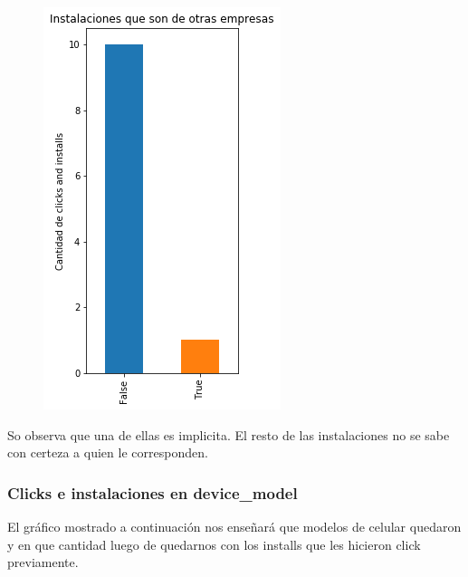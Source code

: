 \documentclass[a4paper, 12pt]{article}
\newcommand\tab[1][1cm]{\hspace*{#1}}
\begin{document}
{{	\FloatBarrier
		\begin{figure}[h]
			\centering
			\includegraphics[scale = 0.5]{images/clicks-installs/implisit.png}
			\caption{}
		\end{figure}
	\FloatBarrier

	\tab So observa que una de ellas es implicita. El resto de las instalaciones no se sabe con certeza a quien le corresponden.
	
	\subsubsection{Clicks e instalaciones en device\_model}
	\tab El gráfico mostrado a continuación nos enseñará que modelos de celular quedaron y en que cantidad luego de quedarnos con los installs que les hicieron click previamente.
	
}}
\end{document}
